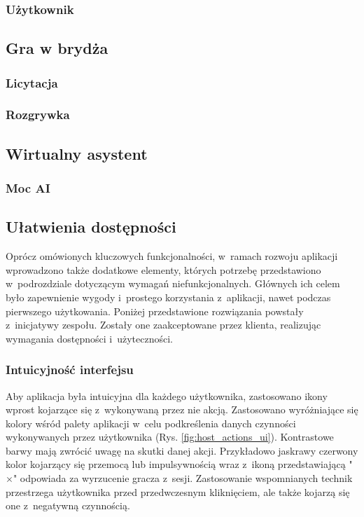 \subsubsection{Użytkownik}


\subsection{Gra w brydża}

\subsubsection{Licytacja}
\subsubsection{Rozgrywka}


\subsection{Wirtualny asystent}

\subsubsection{Moc AI}


\subsection{Ułatwienia dostępności}

Oprócz omówionych kluczowych funkcjonalności, w~ramach rozwoju
aplikacji wprowadzono także dodatkowe elementy, których
potrzebę przedstawiono w~podrozdziale dotyczącym wymagań
niefunkcjonalnych. Głównych ich celem było zapewnienie
wygody i~prostego korzystania z~aplikacji, nawet podczas
pierwszego użytkowania. Poniżej przedstawione rozwiązania powstały
z~inicjatywy zespołu. Zostały one zaakceptowane przez klienta,
realizując wymagania dostępności i~użyteczności.

\subsubsection{Intuicyjność interfejsu}

Aby aplikacja była intuicyjna dla każdego użytkownika,
zastosowano ikony wprost kojarzące się z~wykonywaną
przez nie akcją. Zastosowano wyróżniające się kolory wśród palety
aplikacji w~celu podkreślenia danych czynności wykonywanych
przez użytkownika (Rys. \ref{fig:host_actions_ui}). Kontrastowe barwy mają zwrócić uwagę na
skutki danej akcji. Przykładowo jaskrawy czerwony kolor
kojarzący się przemocą lub impulsywnością wraz z~ikoną
przedstawiającą "$\times$"\xspace odpowiada za wyrzucenie gracza
z~sesji. Zastosowanie wspomnianych technik przestrzega
użytkownika przed przedwczesnym kliknięciem, ale także kojarzą
się one z~negatywną czynnością.

